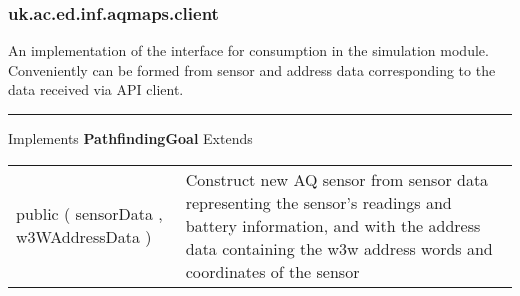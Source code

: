 \subsubsection*{ uk.ac.ed.inf.aqmaps.client }
 {\scriptsize An implementation of the \hyperref[tab:Sensor]{\color{blue}{Sensor}} interface for consumption in the simulation module. Conveniently can be formed from sensor and address data \newline%
 corresponding to the data received via API client.
 
\vspace*{4pt} \hrule \vspace*{3pt}
Implements \textbf{ PathfindingGoal }
Extends \textbf{ \hyperref[tab:Sensor]{\color{blue}{Sensor}} }
\vspace*{-5pt} 
\begin{tabularx}{\linewidth}{X|m{}}
\label{tab:AQSensor}
\begin{raggedleft}public  \textbf{\hyperref[tab:AQSensor]{\color{blue}{AQSensor}} }(\newline \hfill 
\hspace*{ 5pt} \textbf{\hyperref[tab:SensorData]{\color{blue}{SensorData}}} sensorData , \newline
 \hspace*{ 5pt} \textbf{\hyperref[tab:W3WAddressData]{\color{blue}{W3WAddressData}}} w3WAddressData  )
\end{raggedleft} &
 Construct new AQ sensor from sensor data representing the sensor's readings and battery information, and with the address data containing \newline%
 the w3w address words and coordinates of the sensor\\\end{tabularx}
}
